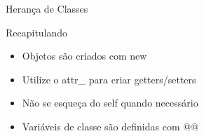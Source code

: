 \begin{frame}{Herança de Classes}    
  
 
\end{frame}

\begin{frame}[fragile,t]{Recapitulando}
  \begin{itemize}
    \item Objetos são criados com \alert{new}
    \item Utilize o \alert{attr\_} para criar getters/setters
    \item Não se esqueça do \alert{self} quando necessário
    \item Variáveis de classe são definidas com \alert{@@}
  \end{itemize}
\end{frame}



